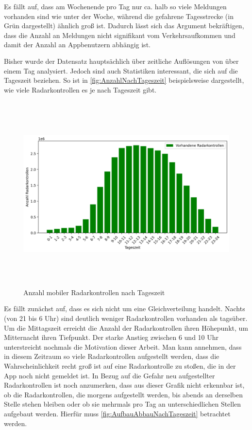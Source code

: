 Es fällt auf, dass am Wochenende pro Tag nur ca. halb so viele Meldungen vorhanden sind wie unter der Woche, während die gefahrene Tagesstrecke (in Grün dargestellt) ähnlich groß ist.
Dadurch lässt sich das Argument bekräftigen, dass die Anzahl an Meldungen nicht signifikant vom Verkehrsaufkommen und damit der Anzahl an Appbenutzern abhängig ist.

Bisher wurde der Datensatz hauptsächlich über zeitliche Auflösungen von über einem Tag analysiert.
Jedoch sind auch Statistiken interessant, die sich auf die Tageszeit beziehen.
So ist in \autoref{fig:AnzahlNachTageszeit} beispielsweise dargestellt, wie viele Radarkontrollen es je nach Tageszeit gibt.

\begin{figure}[h]
    \centering
    \includegraphics[width=1.0\textwidth,height=10cm,keepaspectratio=true]{content/images/AnzahlNachTageszeit.png}
    \caption{Anzahl mobiler Radarkontrollen nach Tageszeit}
    \label{fig:AnzahlNachTageszeit}
\end{figure}

Es fällt zunächst auf, dass es sich nicht um eine Gleichverteilung handelt.
Nachts (von 21 bis 6 Uhr) sind deutlich weniger Radarkontrollen vorhanden als tagsüber.
Um die Mittagszeit erreicht die Anzahl der Radarkontrollen ihren Höhepunkt, um Mitternacht ihren Tiefpunkt.
Der starke Anstieg zwischen 6 und 10 Uhr unterstreicht nochmals die Motivation dieser Arbeit.
Man kann annehmen, dass in diesem Zeitraum so viele Radarkontrollen aufgestellt werden,
dass die Wahrscheinlichkeit recht groß ist auf eine Radarkontrolle zu stoßen, die in der App noch nicht gemeldet ist.
In Bezug auf die Gefahr neu aufgestellter Radarkontrollen ist noch anzumerken, dass aus dieser Grafik nicht erkennbar ist, ob die Radarkontrollen, die morgens aufgestellt werden, bis abends an derselben Stelle stehen bleiben oder ob sie mehrmals pro Tag an unterschiedlichen Stellen aufgebaut werden.
Hierfür muss \autoref{fig:AufbauAbbauNachTageszeit} betrachtet werden.


